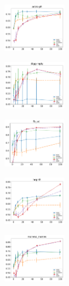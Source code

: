 

\begin{subfigure}
     \centering
         \includegraphics[width=0.24\textwidth]{fig/astro-ph__entropy@_roc_evo}
\end{subfigure}
\begin{subfigure}
         \centering
      \includegraphics[width=0.24\textwidth]{fig/digg-reply__entropy@_roc_evo}               
\end{subfigure}                                                                          
\begin{subfigure}                                                                        
         \centering                                                                      
      \includegraphics[width=0.24\textwidth]{fig/fb_uc__entropy@_roc_evo}
\end{subfigure}                                                                          
\begin{subfigure}                                                                        
         \centering                                                                      
      \includegraphics[width=0.24\textwidth]{fig/hep-th__entropy@_roc_evo}
\end{subfigure}                                                                          
\begin{subfigure}                                                                        
     \centering                                                                          
         \includegraphics[width=0.24\textwidth]{fig/moreno_names__entropy@_roc_evo}
\end{subfigure}
